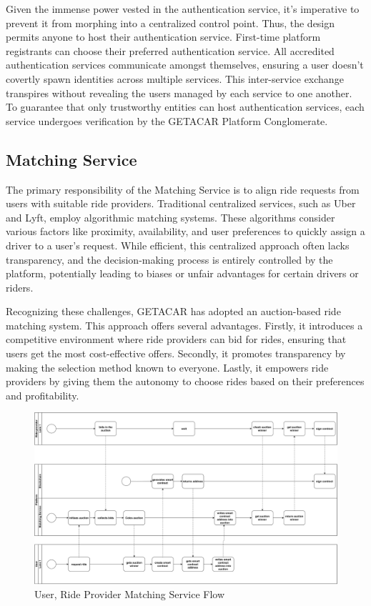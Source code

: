 Given the immense power vested in the authentication service, it's imperative to prevent it from morphing into a centralized control point. Thus, the design permits anyone to host their authentication service. First-time platform registrants can choose their preferred authentication service. All accredited authentication services communicate amongst themselves, ensuring a user doesn't covertly spawn identities across multiple services. This inter-service exchange transpires without revealing the users managed by each service to one another. To guarantee that only trustworthy entities can host authentication services, each service undergoes verification by the GETACAR Platform Conglomerate.

\subsection{Matching Service}\label{subsec:MatchingService}
The primary responsibility of the Matching Service is to align ride requests from users with suitable ride providers. Traditional centralized services, such as Uber and Lyft, employ algorithmic matching systems. These algorithms consider various factors like proximity, availability, and user preferences to quickly assign a driver to a user's request. While efficient, this centralized approach often lacks transparency, and the decision-making process is entirely controlled by the platform, potentially leading to biases or unfair advantages for certain drivers or riders.

Recognizing these challenges, GETACAR has adopted an auction-based ride matching system. This approach offers several advantages. Firstly, it introduces a competitive environment where ride providers can bid for rides, ensuring that users get the most cost-effective offers. Secondly, it promotes transparency by making the selection method known to everyone. Lastly, it empowers ride providers by giving them the autonomy to choose rides based on their preferences and profitability.

\begin{figure}[h]
    \centering
    \includegraphics[width=\linewidth]{data/5.svg}
    \caption{User, Ride Provider Matching Service Flow}
    \label{fig:directSVG}
\end{figure}


